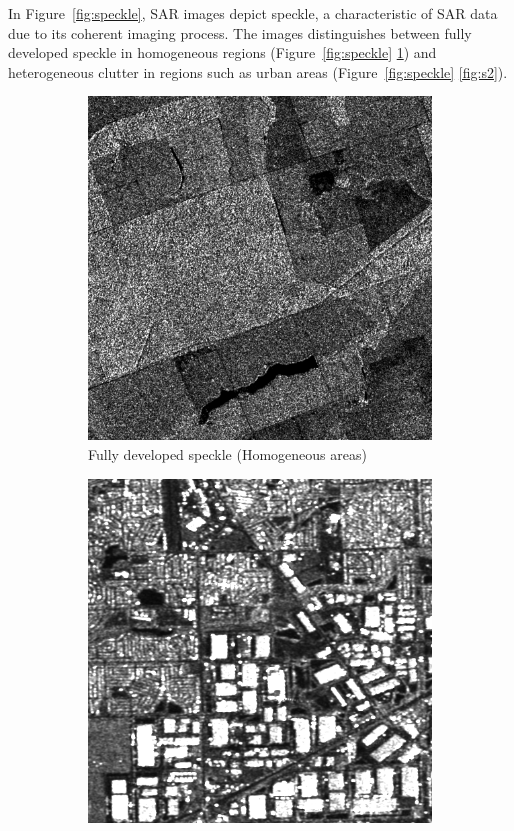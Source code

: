 In Figure~\ref{fig:speckle}, SAR images depict speckle, a characteristic of SAR data due to its coherent imaging process. 
The images distinguishes between fully developed speckle in homogeneous regions (Figure~\ref{fig:speckle} \ref{fig:s1}) and heterogeneous clutter in regions such as urban areas (Figure~\ref{fig:speckle} \ref{fig:s2}).
\begin{figure}[H]
  \centering
  \begin{subfigure}[b]{0.48\textwidth}
    \centering
    \includegraphics[width=.8\textwidth]{../../Images/PNG/Intensity_MG.png}
    \caption{Fully developed speckle (Homogeneous areas)}
    \label{fig:s1}
  \end{subfigure}
  \hfill
  \begin{subfigure}[b]{0.45\textwidth}
    \centering
    \includegraphics[width=.85\textwidth]{../../Images/PNG/urban_intensity.png}

\end{subfigure}
\end{figure}
